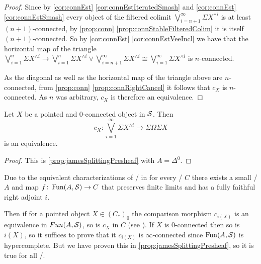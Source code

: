 \begin{prop}
\begin{proof}
        Since by \cref{cor:connEst} \ref{cor:connEstIteratedSmash} and \cref{cor:connEst} \ref{cor:connEstSmash} every object of the filtered colimit $\bigvee\limits_{i=n+1}^{\infty}\Sigma X^{\wedge i}$ is at least $(n+1)$-connected, by \cref{prop:conn} \ref{prop:connStableFilteredColim} it is itself $(n+1)$-connected.
        So by \cref{cor:connEst} \ref{cor:connEstVeeIncl} we have that the horizontal map of the triangle $\bigvee\limits_{i=1}^n\Sigma X^{\wedge i}\to\bigvee\limits_{i=1}^n\Sigma X^{\wedge i}\vee\bigvee\limits_{i=n+1}^{\infty}\Sigma X^{\wedge i}\cong\bigvee\limits_{i=1}^{\infty}\Sigma X^{\wedge i}$ is $n$-connected.

        As the diagonal as well as the horizontal map of the triangle above are $n$-connected, from \cref{prop:conn} \ref{prop:connRightCancel} it follows that $c_X$ is $n$-connected. 
        As $n$ was arbitrary, $c_X$ is therefore an equivalence.
    \end{proof}
\end{prop}
\begin{corollary}\label{cor:classicalJamesSplitting}
    Let $X$ be a pointed and $0$-connected object in $\mathcal{S}$.
    Then     
    \begin{equation*}
        c_X\colon\bigvee\limits_{i=1}^{\infty}\Sigma X^{\wedge i}\to\Sigma\Omega\Sigma X
    \end{equation*}
    is an equivalence. 
    \begin{proof}
        This is \cref{prop:jamesSplittingPresheaf} with $A=\Delta^0$.
    \end{proof}
\end{corollary}
\begin{remark}\label{rem:genTopoiComparisonMapEq}
    Due to the equivalent characterizations of \inftytops/ in \cite[Definition 6.1.0.6]{HTT} for every \inftytop/ $C$ there exists a small \inftycat/ $A$ and map $f\colon\operatorname{Fun}(A,\mathcal{S})\to C$ that preserves finite limits and has a fully faithful right adjoint $i$.
    
    Then if for a pointed object $X\in\left(C_*\right)_0$ the comparison morphism $c_{i(X)}$ is an equivalence in $Fun(A,\mathcal{S})$, so is $c_X$ in $C$ (see \cite[Lemma 4.17]{splittings_21}).
    If $X$ is $0$-connected then so is $i(X)$, so it suffices to prove that it $c_{i(X)}$ is $\infty$-connected since $\operatorname{Fun}(A,\mathcal{S})$ is hypercomplete. %
    But we have proven this in \cref{prop:jamesSplittingPresheaf}, so it is true for all \inftytops/.
\end{remark}

